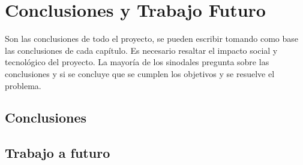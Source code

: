 \chapter{Conclusiones y Trabajo Futuro}
Son las conclusiones de todo el proyecto, se pueden escribir tomando como base las conclusiones de cada capítulo. Es necesario resaltar el impacto social y tecnológico del proyecto. La mayoría de los sinodales pregunta sobre las conclusiones y si se concluye que se cumplen los objetivos y se resuelve el problema.



\section{Conclusiones}


\section{Trabajo a futuro}


